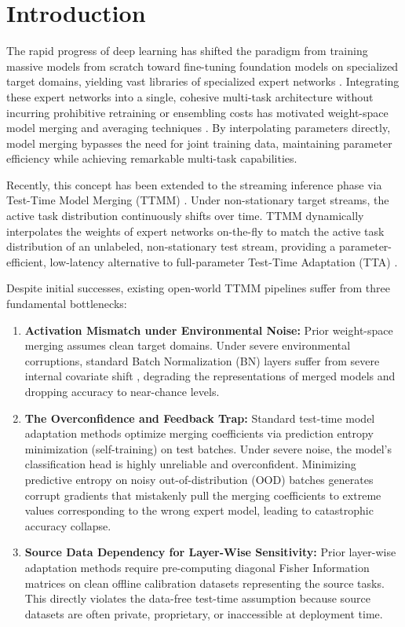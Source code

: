 \documentclass{article}
\theoremstyle{plain}
\theoremstyle{definition}
\theoremstyle{remark}
\begin{document}
\section{Introduction}
\label{sec:intro}
The rapid progress of deep learning has shifted the paradigm from training massive models from scratch toward fine-tuning foundation models on specialized target domains, yielding vast libraries of specialized expert networks \cite{wortsman22, radford21}. Integrating these expert networks into a single, cohesive multi-task architecture without incurring prohibitive retraining or ensembling costs has motivated weight-space model merging and averaging techniques \cite{ilharco23, yadav23, yu-dong23, ainsworth23}. By interpolating parameters directly, model merging bypasses the need for joint training data, maintaining parameter efficiency while achieving remarkable multi-task capabilities.

Recently, this concept has been extended to the streaming inference phase via Test-Time Model Merging (TTMM) \cite{yang24, hubotter26}. Under non-stationary target streams, the active task distribution continuously shifts over time. TTMM dynamically interpolates the weights of expert networks on-the-fly to match the active task distribution of an unlabeled, non-stationary test stream, providing a parameter-efficient, low-latency alternative to full-parameter Test-Time Adaptation (TTA) \cite{wang21}.

Despite initial successes, existing open-world TTMM pipelines suffer from three fundamental bottlenecks:
\begin{enumerate}
    \item \textbf{Activation Mismatch under Environmental Noise:} Prior weight-space merging assumes clean target domains. Under severe environmental corruptions, standard Batch Normalization (BN) \cite{ioffe15} layers suffer from severe internal covariate shift \cite{schneider20}, degrading the representations of merged models and dropping accuracy to near-chance levels.
    \item \textbf{The Overconfidence and Feedback Trap:} Standard test-time model adaptation methods optimize merging coefficients via prediction entropy minimization (self-training) on test batches. Under severe noise, the model's classification head is highly unreliable and overconfident. Minimizing predictive entropy on noisy out-of-distribution (OOD) batches generates corrupt gradients that mistakenly pull the merging coefficients to extreme values corresponding to the wrong expert model, leading to catastrophic accuracy collapse.
    \item \textbf{Source Data Dependency for Layer-Wise Sensitivity:} Prior layer-wise adaptation methods require pre-computing diagonal Fisher Information matrices on clean offline calibration datasets representing the source tasks. This directly violates the data-free test-time assumption because source datasets are often private, proprietary, or inaccessible at deployment time.
\end{enumerate}
\end{document}
